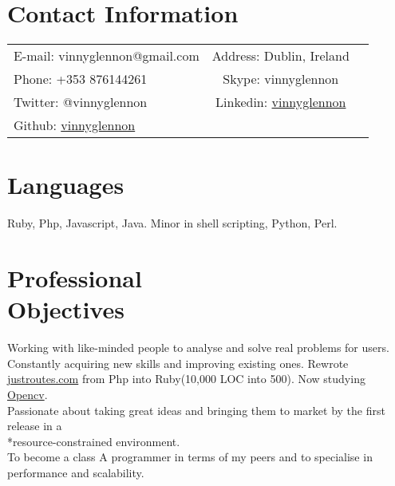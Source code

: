 \documentclass[margin,line]{resume}
\begin{document}
\begin{resume}

    \section{\mysidestyle Contact Information}

    \begin{tabular}{ l c l}
    E-mail: vinnyglennon@gmail.com & Address: Dublin, Ireland\\
    Phone: +353 876144261 & Skype: vinnyglennon\\
    Twitter: @vinnyglennon & Linkedin: \href{http://ie.linkedin.com/in/vinnyglennon}{vinnyglennon}\\
    Github: \href{https://github.com/vinnyglennon}{vinnyglennon} \\
    \end{tabular}

    \section{\mysidestyle Languages}
    Ruby, Php, Javascript, Java. Minor in shell scripting, Python, Perl.

    \section{\mysidestyle Professional \\ Objectives}
    Working with like-minded people to analyse and solve real problems for users.\vspace{1mm}\\%
    Constantly acquiring new skills and improving existing ones. Rewrote \href{http://justroutes.com}{justroutes.com} from Php into Ruby(10,000 LOC into 500). Now studying \href{http://opencv.willowgarage.com/wiki/}{Opencv}.\vspace{1mm}\\%
    Passionate about taking great ideas and bringing them to market by the first release in a \\*resource-constrained environment.\vspace{1mm}\\%
    To become a class A programmer in terms of my peers and to specialise in performance and scalability.
    

\end{resume}
\end{document}
